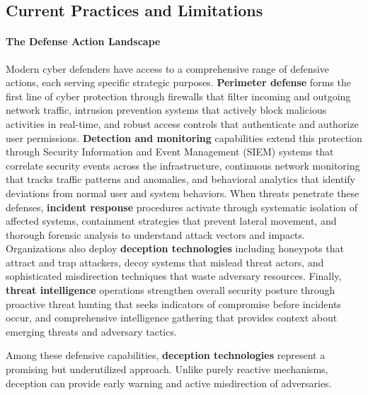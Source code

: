 \documentclass[12pt,oneside]{article}
\newcommand{\kwz}[1]{
  {\color{magenta} [KWZ: {#1}]}
 }
\begin{document}




\subsection{Current Practices and Limitations}


\paragraph{The Defense Action Landscape} Modern cyber defenders have access to a comprehensive range of defensive actions, each serving specific strategic purposes. \textbf{Perimeter defense} forms the first line of cyber protection through firewalls that filter incoming and outgoing network traffic, intrusion prevention systems that actively block malicious activities in real-time, and robust access controls that authenticate and authorize user permissions. \textbf{Detection and monitoring} capabilities extend this protection through Security Information and Event Management (SIEM) systems that correlate security events across the infrastructure, continuous network monitoring that tracks traffic patterns and anomalies, and behavioral analytics that identify deviations from normal user and system behaviors. When threats penetrate these defenses, \textbf{incident response} procedures activate through systematic isolation of affected systems, containment strategies that prevent lateral movement, and thorough forensic analysis to understand attack vectors and impacts. Organizations also deploy \textbf{deception technologies} including honeypots that attract and trap attackers, decoy systems that mislead threat actors, and sophisticated misdirection techniques that waste adversary resources. Finally, \textbf{threat intelligence} operations strengthen overall security posture through proactive threat hunting that seeks indicators of compromise before incidents occur, and comprehensive intelligence gathering that provides context about emerging threats and adversary tactics.


Among these defensive capabilities, \textbf{deception technologies} represent a promising but underutilized approach. Unlike purely reactive mechanisms, deception can provide early warning and active misdirection of adversaries.
\end{document}
